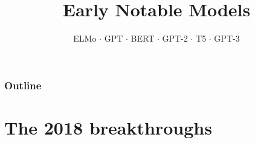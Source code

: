 \documentclass[aspectratio=169]{beamer}
\title{Early Notable Models}
\subtitle{ELMo $\cdot$ GPT $\cdot$ BERT $\cdot$ GPT-2 $\cdot$ T5 $\cdot$ GPT-3}
\date{}
\begin{document}
\begin{frame}
\titlepage
\end{frame}

\begin{frame}
\frametitle{Outline}
\tableofcontents
\end{frame}

\section{The 2018 breakthroughs}
\end{document}
